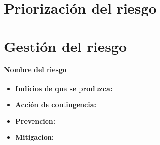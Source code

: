 \documentclass[spanish,a4paper,12pt]{report}	%
\begin{document}

\newpage
\mbox{}
\thispagestyle{empty}						%
\newpage

\part{Priorización del riesgo}

\part{Gestión del riesgo}

\subsection*{Nombre del riesgo}			%
	\begin{itemize}
		\item \textbf {Indicios de que se produzca: }
		\item \textbf {Acción de contingencia: }
		\item \textbf {Prevencion: }
		\item \textbf {Mitigacion: }
	\end{itemize}



\newpage
\mbox{}
\thispagestyle{empty}						%
\newpage
\end{document}
